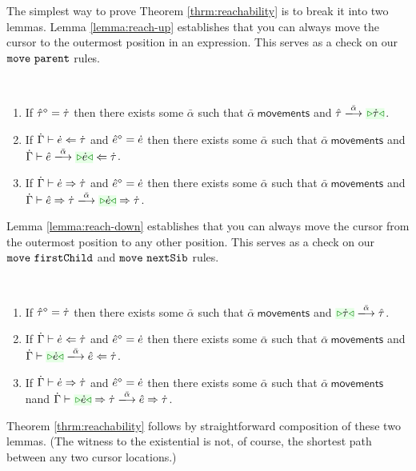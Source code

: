 The simplest way to prove Theorem \ref{thrm:reachability} is to  break it into two lemmas. Lemma \ref{lemma:reach-up} establishes that you can always move the cursor to the outermost position in an expression. This serves as a check on our $\mathtt{move}~\mathtt{parent}$ rules.
\begin{lemma}[Reach Up]\label{lemma:reach-up} ~
\begin{enumerate}[itemsep=0px,partopsep=0px,topsep=0px]
\item If $\hat{\tau}^{\diamond}=\dot{\tau}$ then there exists some $\bar\alpha$ such that $\bar\alpha~\mathsf{movements}$ and $\performTyp{\ztau}{\bar\alpha}{\zwsel{\htau}}$.
\item If $\dot{\Gamma} \vdash \dot{e} \Leftarrow \dot{\tau}$ and $\hat{e}^{\diamond}=\dot{e}$ then there exists some $\bar\alpha$ such that $\bar\alpha~\mathsf{movements}$ and $\performAna{\hGamma}{\zexp}{\htau}{\bar\alpha}{\zwsel{\hexp}}$. 
\item If $\dot{\Gamma} \vdash \dot{e} \Rightarrow \dot{\tau}$ and $\hat{e}^{\diamond}=\dot{e}$ then there exists some $\bar\alpha$ such that $\bar\alpha~\mathsf{movements}$ and $\performSyn{\hGamma}{\zexp}{\htau}{\bar\alpha}{\zwsel{\hexp}}{\htau}$.
\end{enumerate}
\end{lemma}
Lemma \ref{lemma:reach-down} establishes that you can always move the cursor from the outermost position to any other position. This serves as a check on our $\mathtt{move}~\mathtt{firstChild}$ and $\mathtt{move}~\mathtt{nextSib}$ rules. 
\begin{lemma}\label{lemma:reach-down} ~
\begin{enumerate}[itemsep=0px,partopsep=0px,topsep=0px]
\item If $\hat{\tau}^{\diamond}=\dot{\tau}$ then there exists some $\bar\alpha$ such that $\bar\alpha~\mathsf{movements}$ and $\performTyp{\zwsel{\htau}}{\bar\alpha}{\ztau}$.
\item If $\dot{\Gamma} \vdash \dot{e} \Leftarrow \dot{\tau}$ and $\hat{e}^{\diamond}=\dot{e}$ then there exists some $\bar\alpha$ such that $\bar\alpha~\mathsf{movements}$ and $\performAna{\hGamma}{\zwsel{\hexp}}{\htau}{\bar\alpha}{\zexp}$.
\item If $\dot{\Gamma} \vdash \dot{e} \Rightarrow \dot{\tau}$ and $\hat{e}^{\diamond}=\dot{e}$ then there exists some $\bar\alpha$ such that $\bar\alpha~\mathsf{movements}$ nand $\performSyn{\hGamma}{\zwsel{\hexp}}{\htau}{\bar\alpha}{\zexp}{\htau}$.
\end{enumerate}
\end{lemma}
Theorem \ref{thrm:reachability} follows by straightforward composition of these two lemmas. (The witness to the existential is not, of course, the shortest path between any two cursor locations.)


